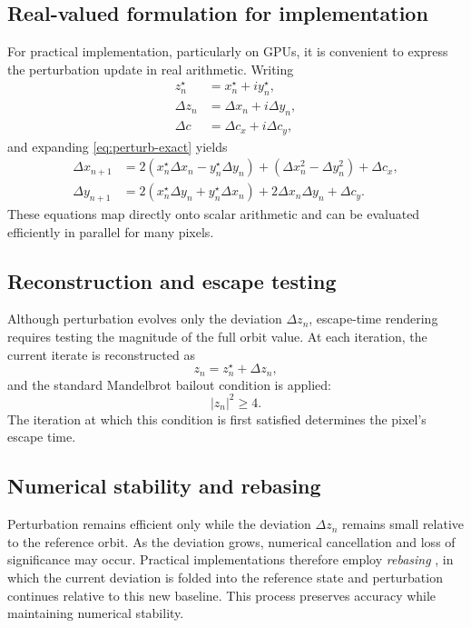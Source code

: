 \subsection{Real-valued formulation for implementation}

For practical implementation, particularly on GPUs, it is convenient to express
the perturbation update in real arithmetic. Writing
\begin{align*}
z_n^\star &= x_n^\star + i y_n^\star, \\
\Delta z_n &= \Delta x_n + i \Delta y_n, \\
\Delta c &= \Delta c_x + i \Delta c_y,
\end{align*}
and expanding \cref{eq:perturb-exact} yields
\begin{align}
\Delta x_{n+1}
&= 2(x_n^\star \Delta x_n - y_n^\star \Delta y_n)
   + (\Delta x_n^2 - \Delta y_n^2)
   + \Delta c_x, \\
\Delta y_{n+1}
&= 2(x_n^\star \Delta y_n + y_n^\star \Delta x_n)
   + 2 \Delta x_n \Delta y_n
   + \Delta c_y.
\end{align}
These equations map directly onto scalar arithmetic and can be evaluated
efficiently in parallel for many pixels.

\subsection{Reconstruction and escape testing}

Although perturbation evolves only the deviation \(\Delta z_n\), escape-time
rendering requires testing the magnitude of the full orbit value. At each
iteration, the current iterate is reconstructed as
\[
z_n = z_n^\star + \Delta z_n,
\]
and the standard Mandelbrot bailout condition is applied:
\[
|z_n|^2 \ge 4.
\]
The iteration at which this condition is first satisfied determines the pixel's
escape time.

\subsection{Numerical stability and rebasing}

Perturbation remains efficient only while the deviation \(\Delta z_n\) remains
small relative to the reference orbit. As the deviation grows, numerical
cancellation and loss of significance may occur. Practical implementations
therefore employ \emph{rebasing} \cite{Zhuoran2023ReferenceCompression,HeilandAllen2022DeepZoom},
in which the current deviation
is folded into the reference state and perturbation continues relative to this
new baseline. This process preserves accuracy while maintaining numerical
stability.

